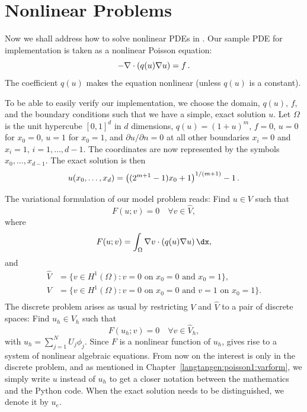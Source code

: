 \section{Nonlinear Problems}
\label{langtangen:poisson:nonlinear}



Now we shall address how to solve nonlinear PDEs in \fenics. Our
sample PDE for implementation is taken as a nonlinear Poisson equation:
\begin{equation}
-\nabla\cdot\left( q(u)\nabla u\right) = f\thinspace .
\end{equation}
The coefficient $q(u)$ makes the equation nonlinear (unless $q(u)$
is a constant).

To be able to easily verify our implementation,
we choose the domain, $q(u)$, $f$, and the boundary
conditions such that we have
a simple, exact solution $u$. Let
$\Omega$ is the unit hypercube $[0, 1]^d$
in $d$ dimensions, $q(u)=(1+u)^m$, $f=0$, $u=0$ for $x_0=0$, $u=1$
for $x_0=1$, and $\partial u/\partial n=0$ at all other boundaries
$x_i=0$ and $x_i=1$, $i=1,\ldots,d-1$. The coordinates are now represented by
the symbols $x_0,\ldots,x_{d-1}$. The exact solution is then
\begin{equation}
u(x_0,\ldots,x_d) = \left((2^{m+1}-1)x_0 + 1\right)^{1/(m+1)} - 1\thinspace .
\end{equation}

The variational formulation of our model problem reads:
Find $u \in V$ such that
\begin{equation} \label{langtangen:poisson:nonlinear}
  F(u; v) = 0 \quad \forall v \in \hat{V},
\end{equation}
where
\begin{equation}
\label{langtangen:poisson:nonlinear2}
F(u; v) = \int_\Omega \nabla v\cdot\left( q(u)\nabla u\right)\dx,
\end{equation}
and
\begin{displaymath}
  \begin{split}
    \hat{V} &= \{v \in H^1(\Omega) : v = 0 \mbox{ on } x_0=0\mbox{ and }x_0=1\}, \\
     V      &= \{v \in H^1(\Omega) : v = 0 \mbox{ on } x_0=0\mbox{ and } v = 1\mbox{ on }x_0=1\}. \\
  \end{split}
\end{displaymath}
The discrete problem arises as usual by restricting $V$ and $\hat V$ to a
pair of discrete spaces: Find $u_h\in V_h$ such that
\begin{equation}
  F(u_h; v) = 0 \quad \forall v \in \hat{V}_h,
\label{langtangen:poisson:nonlinear:d}
\end{equation}
with $u_h = \sum_{j=1}^N U_j \phi_j$. Since $F$ is a nonlinear function
of $u_h$,  gives rise to a system of
nonlinear algebraic equations.
From now on the interest is only in the discrete problem, and as mentioned
in Chapter~\ref{langtangen:poisson1:varform},
we simply write $u$ instead of $u_h$ to get a closer notation between
the mathematics and the Python code. When the exact solution needs to
be distinguished, we denote it by $u_e$.

